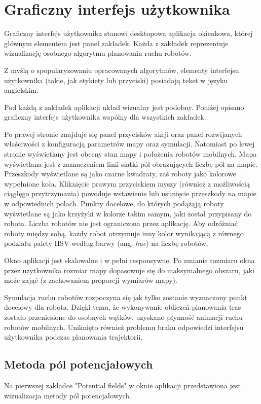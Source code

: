 \section{Graficzny interfejs użytkownika}
Graficzny interfejs użytkownika stanowi desktopowa aplikacja okienkowa, której głównym elementem jest panel zakładek. Każda z zakładek reprezentuje wizualizację osobnego algorytmu planowania ruchu robotów.

Z myślą o spopularyzowaniu opracowanych algorytmów, elementy interfejsu użytkownika (takie, jak etykiety lub przyciski) posiadają tekst w języku angielskim.

Pod każdą z zakładek aplikacji układ wizualny jest podobny. Poniżej opisano graficzny interfejs użytkownika wspólny dla wszystkich zakładek.

Po prawej stronie znajduje się panel przycisków akcji oraz panel rozwijanych właściwości z konfiguracją parametrów mapy oraz symulacji. Natomiast po lewej stronie wyświetlany jest obecny stan mapy i położenia robotów mobilnych. Mapa wyświetlana jest z zaznaczeniem linii siatki pól obrazujących liczbę pól na mapie. Przeszkody wyświetlane są jako czarne kwadraty, zaś roboty jako kolorowe wypełnione koła.
Kliknięcie prawym przyciskiem myszy (również z możliwością ciągłęgo przytrzymania) powoduje wstawienie lub usunięcie przeszkody na mapie w odpowiednich polach.
Punkty docelowe, do których podążąją roboty wyświetlane są jako krzyżyki w kolorze takim samym, jaki został przypisany do robota. Liczba robotów nie jest ograniczona przez aplikację. Aby odróżniać roboty między sobą, każdy robot otrzymuje inny kolor wynikającą z równego podziału palety HSV według barwy (ang. {\it hue}) na liczbę robotów.

Okno aplikacji jest skalowalne i w pełni responsywne. Po zmianie rozmiaru okna przez użytkownika rozmiar mapy dopasowuje się do maksymalnego obszaru, jaki może zająć (z zachowaniem proporcji wymiarów mapy).

Symulacja ruchu robotów rozpoczyna się jak tylko zostanie wyznaczony punkt docelowy dla robota. Dzięki temu, że wykonywanie obliczeń planowania tras zostało przeniesione do osobnych wątków, uzyskano płynność animacji ruchu robotów mobilnych. Uniknięto również problemu braku odpowiedzi interfejsu użytkownika podczas planowania trajektorii.

\subsection{Metoda pól potencjałowych}
Na pierwszej zakładce "Potential fields" w oknie aplikacji przedstawiona jest wizualizacja metody pól potencjałowych.

